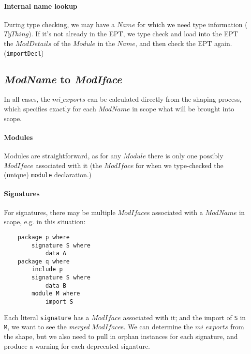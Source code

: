 \documentclass{article}
\newcommand{\I}[1]{\ensuremath{\mathit{#1}}}
\begin{document}
\paragraph{Internal name lookup}  During type checking, we may have
a \I{Name} for which we need type information (\I{TyThing}).  If it's not already in the
EPT, we type check and load
into the EPT the \I{ModDetails} of the \I{Module} in the \I{Name},
and then check the EPT again. (\verb|importDecl|)

\subsection{\textit{ModName} to \textit{ModIface}}

In all cases, the \I{mi\_exports} can be calculated directly from the
shaping process, which specifies exactly for each \I{ModName} in scope
what will be brought into scope.

\paragraph{Modules} Modules are straightforward, as for any
\I{Module} there is only one possibly \I{ModIface} associated
with it (the \I{ModIface} for when we type-checked the (unique) \verb|module|
declaration.)

\paragraph{Signatures} For signatures, there may be multiple \I{ModIface}s
associated with a \I{ModName} in scope, e.g. in this situation:

\begin{verbatim}
    package p where
        signature S where
            data A
    package q where
        include p
        signature S where
            data B
        module M where
            import S
\end{verbatim}
%
Each literal \verb|signature| has a \I{ModIface} associated with it; and
the import of \verb|S| in \verb|M|, we want to see the \emph{merged}
\I{ModIface}s.  We can determine the \I{mi\_exports} from the shape,
but we also need to pull in orphan instances for each signature, and
produce a warning for each deprecated signature.
\end{document}
